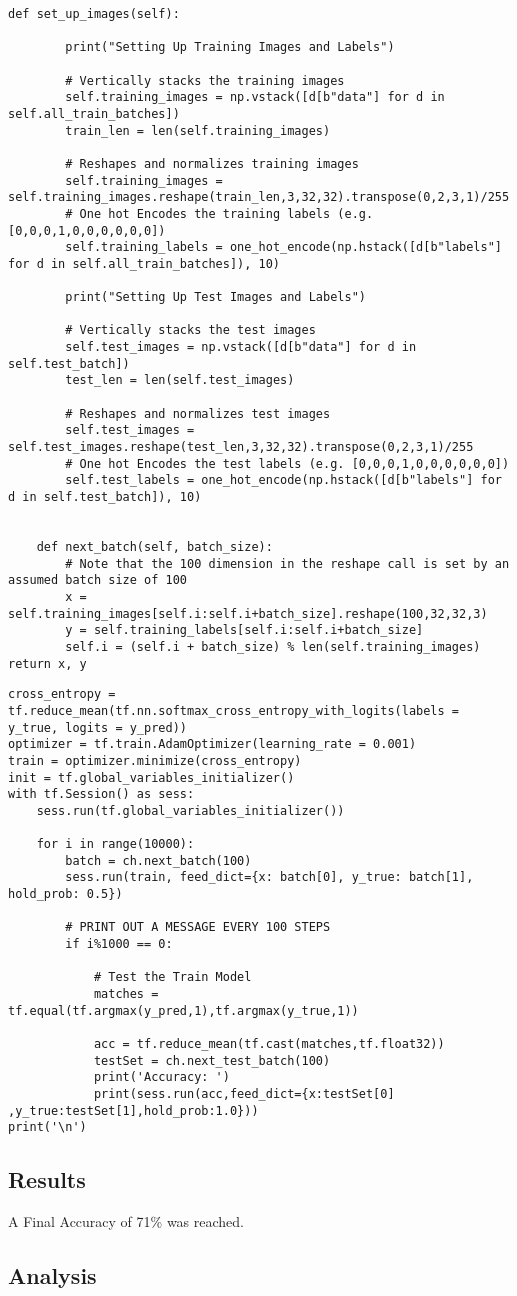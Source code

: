 \begin{lstlisting}[style=Python]
def set_up_images(self):
        
        print("Setting Up Training Images and Labels")
        
        # Vertically stacks the training images
        self.training_images = np.vstack([d[b"data"] for d in self.all_train_batches])
        train_len = len(self.training_images)
        
        # Reshapes and normalizes training images
        self.training_images = self.training_images.reshape(train_len,3,32,32).transpose(0,2,3,1)/255
        # One hot Encodes the training labels (e.g. [0,0,0,1,0,0,0,0,0,0])
        self.training_labels = one_hot_encode(np.hstack([d[b"labels"] for d in self.all_train_batches]), 10)
        
        print("Setting Up Test Images and Labels")
        
        # Vertically stacks the test images
        self.test_images = np.vstack([d[b"data"] for d in self.test_batch])
        test_len = len(self.test_images)
        
        # Reshapes and normalizes test images
        self.test_images = self.test_images.reshape(test_len,3,32,32).transpose(0,2,3,1)/255
        # One hot Encodes the test labels (e.g. [0,0,0,1,0,0,0,0,0,0])
        self.test_labels = one_hot_encode(np.hstack([d[b"labels"] for d in self.test_batch]), 10)

        
    def next_batch(self, batch_size):
        # Note that the 100 dimension in the reshape call is set by an assumed batch size of 100
        x = self.training_images[self.i:self.i+batch_size].reshape(100,32,32,3)
        y = self.training_labels[self.i:self.i+batch_size]
        self.i = (self.i + batch_size) % len(self.training_images)
return x, y
\end{lstlisting}

\begin{lstlisting}[style=Python]
cross_entropy = tf.reduce_mean(tf.nn.softmax_cross_entropy_with_logits(labels = y_true, logits = y_pred))
optimizer = tf.train.AdamOptimizer(learning_rate = 0.001)
train = optimizer.minimize(cross_entropy)
init = tf.global_variables_initializer()
with tf.Session() as sess:
    sess.run(tf.global_variables_initializer())

    for i in range(10000):
        batch = ch.next_batch(100)
        sess.run(train, feed_dict={x: batch[0], y_true: batch[1], hold_prob: 0.5})
        
        # PRINT OUT A MESSAGE EVERY 100 STEPS
        if i%1000 == 0:
            
            # Test the Train Model
            matches = tf.equal(tf.argmax(y_pred,1),tf.argmax(y_true,1))

            acc = tf.reduce_mean(tf.cast(matches,tf.float32))
            testSet = ch.next_test_batch(100)
            print('Accuracy: ')
            print(sess.run(acc,feed_dict={x:testSet[0] ,y_true:testSet[1],hold_prob:1.0}))
print('\n')
\end{lstlisting}

\subsection*{Results}
A Final Accuracy of 71\% was reached.

\subsection*{Analysis}

